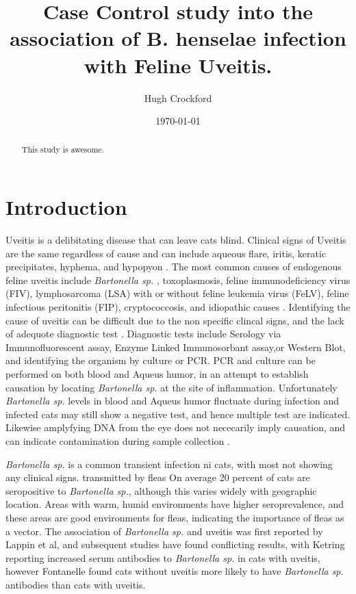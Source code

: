 \documentclass[11pt,twocolumn]{article}
\title{Case Control study into the association of B. henselae infection with Feline Uveitis.}
\author{Hugh Crockford}
\date{\today}
\begin{document}
	\maketitle

\begin{abstract}
	This study is awesome.
\end{abstract}

	\section{Introduction}
		Uveitis is a delibitating disease that can leave cats blind. 
		Clinical signs of Uveitis are the same regardless of cause and can include aqueous flare, iritis, keratic precipitates, hyphema, and hypopyon \cite{Powell2010}.
		The most common causes of endogenous feline uveitis include \emph{Bartonella sp.} , toxoplasmosis, feline immunodeficiency virus (FIV), lymphosarcoma (LSA) with or without feline leukemia virus (FeLV), feline infectious peritonitis (FIP), cryptococcosis, and idiopathic causes \cite{Powell2001}.
		Identifying the cause of uveitis can be difficult due to the non specific clincal signs, and the lack of adequote diagnostic test \cite{Fontenelle2008}.
		Diagnostic tests include Serology via Immunofluorescent assay, Enzyme Linked Immunosorbant assay,or Western Blot, and identifying the organism by culture or PCR.
		PCR and culture can be performed on both blood and Aqueus humor, in an attempt to establish causation by locating \emph{Bartonella sp.} at the site of inflammation. Unfortunately \emph{Bartonella sp.} levels in blood and Aqueus humor fluctuate during infection and infected cats may still show a negative test, and hence multiple test are indicated\cite{Guptill2010}. Likewise amplyfying DNA from the eye does not nececarily imply causation, and can indicate contamination during sample collection \cite{Powell2010}.
		
		\emph{Bartonella sp.} is a common transient infection ni cats, with most not showing any clinical signs. 
		transmitted by fleas
		On average 20 percent of cats are seropositive to \emph{Bartonella sp.}, although this varies widely with geographic location\cite{Jameson1995a}. Areas with warm, humid environments have higher seroprevalence, and these areas are good environments for fleas, indicating the importance of fleas as a vector.
		The association of \emph{Bartonella sp.} and uveitis was first reported by Lappin et al\cite{Lappin1999}, and subsequent studies have found conflicting results, with Ketring reporting increased serum antibodies to \emph{Bartonella sp.} in cats with uveitis\cite{Ketring2004}, however Fontanelle found cats without uveitis more likely to have \emph{Bartonella sp.} antibodies than cats with uveitis.
		
\end{document}
